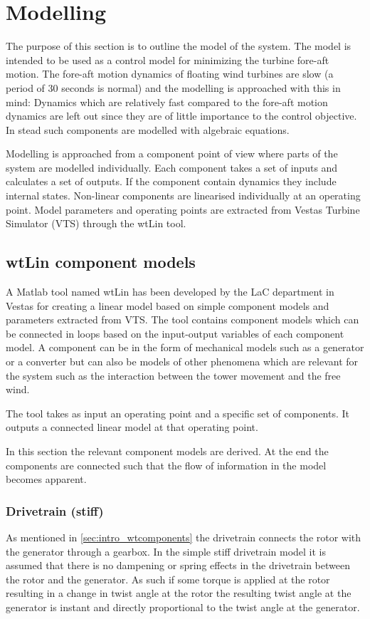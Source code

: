 \section{Modelling} \label{sec:mod} %
The purpose of this section is to outline the model of the system. The model is intended to be used as a control model for minimizing the turbine fore-aft motion. The fore-aft motion dynamics of floating wind turbines are slow (a period of 30 seconds is normal) and the modelling is approached with this in mind: Dynamics which are relatively fast compared to the fore-aft motion dynamics are left out since they are of little importance to the control objective. In stead such components are modelled with algebraic equations. 

Modelling is approached from a component point of view where parts of the system are modelled individually. Each component takes a set of inputs and calculates a set of outputs. If the component contain dynamics they include internal states. Non-linear components are linearised individually at an operating point. Model parameters and operating points are extracted from Vestas Turbine Simulator (VTS) through the wtLin tool.


\subsection{wtLin component models}
A Matlab tool named wtLin has been developed by the LaC department in Vestas for creating a linear model based on simple component models and parameters extracted from VTS. The tool contains component models which can be connected in loops based on the input-output variables of each component model. A component can be in the form of mechanical models such as a generator or a converter but can also be models of other phenomena which are relevant for the system such as the interaction between the tower movement and the free wind.

The tool takes as input an operating point and a specific set of components. It outputs a connected linear model at that operating point.

In this section the relevant component models are derived. At the end the components are connected such that the flow of information in the model becomes apparent. 


\subsubsection{Drivetrain (stiff)}
As mentioned in \cref{sec:intro_wtcomponents} the drivetrain connects the rotor with the generator through a gearbox. In the simple stiff drivetrain model it is assumed that there is no dampening or spring effects in the drivetrain between the rotor and the generator. As such if some torque is applied at the rotor resulting in a change in twist angle at the rotor the resulting twist angle at the generator is instant and directly proportional to the twist angle at the generator.

